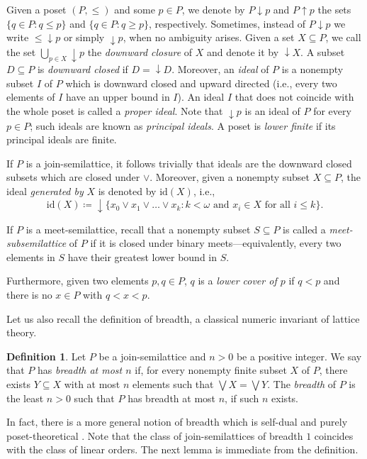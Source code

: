 \documentclass[]{amsart}
\theoremstyle{definition}
\newtheorem{definition}[theorem]{Definition}
\theoremstyle{remark}
\begin{document}
Given a poset $(P, \le)$ and some $p \in P$, we denote by $P \downarrow p$ and $P \uparrow p$ the sets $\{q \in P : q \le p\}$ and $\{q \in P : q \ge p\}$, respectively. Sometimes, instead of $P \downarrow p$ we write ${\le} \downarrow p$ or simply ${\downarrow} p$, when no ambiguity arises.  Given a set $X \subseteq P$, we call the set $\bigcup_{p \in X} {\downarrow} p$ the \emph{downward closure} of $X$ and denote it by ${\downarrow }X$. A subset $D \subseteq P$ is \emph{downward closed} if $D = {\downarrow} D$. Moreover, an \emph{ideal} of $P$ is a nonempty subset $I$ of $P$ which is downward closed and upward directed (i.e., every two elements of $I$ have an upper bound in $I$). An ideal $I$ that does not coincide with the whole poset is called a \emph{proper ideal}. Note that ${\downarrow} p$ is an ideal of $P$ for every $p \in P$; such ideals are known as \emph{principal ideals}. A poset is \emph{lower finite} if its principal ideals are finite. 

If $P$ is a join-semilattice, it follows trivially that ideals are the downward closed subsets which are closed under $\vee$. Moreover, given a nonempty subset $X \subseteq P$, the ideal \emph{generated by} $X$ is denoted by $\mathrm{id}(X)$, i.e.,
\[
\mathrm{id}(X) \coloneqq {\downarrow} \big\{x_0 \vee x_1 \vee \ldots \vee x_k : k < \omega \text{ and } x_i \in X \text{ for all }i \le k\big\}.
\]


If $P$ is a meet-semilattice, recall that a nonempty subset $S\subseteq P$ is called a \emph{meet-subsemilattice} of $P$ if it is closed under binary meets---equivalently, every two elements in $S$ have their greatest lower bound in $S$.


Furthermore, given two elements $p,q \in P$, $q$ is a \emph{lower cover of $p$} if $q < p$ and there is no $x \in P$ with $q < x < p$. 

Let us also recall the definition of breadth, a classical numeric invariant of lattice theory. 
\begin{definition}
Let $P$ be a join-semilattice and $n > 0$ be a positive integer. We say that $P$ has \emph{breadth at most $n$} if, for every nonempty finite subset $X$ of  $P$, there exists $Y\subseteq X$ with at most $n$ elements such that $\bigvee X = \bigvee Y$. The \emph{breadth} of $P$ is the least $n > 0$ such that $P$ has breadth at most $n$, if such $n$ exists.
\end{definition}
In fact, there is a more general notion of breadth which is self-dual and purely poset-theoretical \cite[\S 4]{MR0732199}. Note that the class of join-semilattices of breadth $1$ coincides with the class of linear orders. The next lemma is immediate from the definition.
\end{document}
